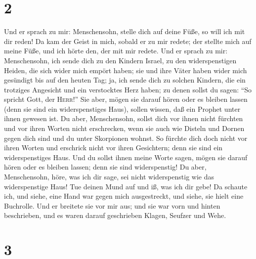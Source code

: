 \hypertarget{section-1}{%
\section{2}\label{section-1}}

 Und er sprach zu mir: Menschensohn, stelle dich auf deine
Füße, so will ich mit dir reden!  Da kam der Geist in
mich, sobald er zu mir redete; der stellte mich auf meine Füße, und ich
hörte den, der mit mir redete.  Und er sprach zu mir:
Menschensohn, ich sende dich zu den Kindern Israel, zu den
widerspenstigen Heiden, die sich wider mich empört haben; sie und ihre
Väter haben wider mich gesündigt bis auf den heuten Tag; 
ja, ich sende dich zu solchen Kindern, die ein trotziges Angesicht und
ein verstocktes Herz haben; zu denen sollst du sagen: ``So spricht Gott,
der \textsc{Herr}!''  Sie aber, mögen sie darauf hören
oder es bleiben lassen (denn sie sind ein widerspenstiges Haus), sollen
wissen, daß ein Prophet unter ihnen gewesen ist.  Du aber,
Menschensohn, sollst dich vor ihnen nicht fürchten und vor ihren Worten
nicht erschrecken, wenn sie auch wie Disteln und Dornen gegen dich sind
und du unter Skorpionen wohnst. So fürchte dich doch nicht vor ihren
Worten und erschrick nicht vor ihren Gesichtern; denn sie sind ein
widerspenstiges Haus.  Und du sollst ihnen meine Worte
sagen, mögen sie darauf hören oder es bleiben lassen; denn sie sind
widerspenstig!  Du aber, Menschensohn, höre, was ich dir
sage, sei nicht widerspenstig wie das widerspenstige Haus! Tue deinen
Mund auf und iß, was ich dir gebe!  Da schaute ich, und
siehe, eine Hand war gegen mich ausgestreckt, und siehe, sie hielt eine
Buchrolle.  Und er breitete sie vor mir aus; und sie war
vorn und hinten beschrieben, und es waren darauf geschrieben Klagen,
Seufzer und Wehe.

\hypertarget{section-2}{%
\section{3}\label{section-2}}

